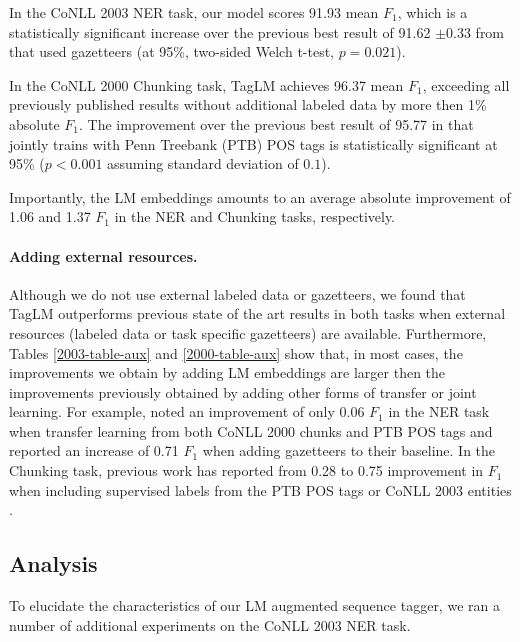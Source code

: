 \documentclass[11pt,a4paper]{article}
\begin{document}
In the CoNLL 2003 NER task, our model scores 91.93
mean $F_1$, which is a statistically significant increase over the previous best result of 91.62 $\pm 0.33$ from \citet{chiu-nichols-2016} that used gazetteers (at 95\%, two-sided Welch t-test, $p=0.021$).  

In the CoNLL 2000 Chunking task, TagLM achieves 96.37 mean $F_1$, exceeding all previously published
results without additional labeled data by more then 1\% absolute $F_1$. 
The improvement over the previous best result of 95.77 in \citet{joint-many-iclr07} that jointly trains with Penn Treebank (PTB) POS tags is statistically significant at
95\% ($p < 0.001$ assuming standard deviation of $0.1$).

Importantly, the LM embeddings amounts to an average absolute improvement of 1.06 and 1.37 $F_1$ in the NER and Chunking tasks, respectively.

\paragraph{Adding external resources.}
Although we do not use external labeled data or gazetteers, we found that TagLM outperforms previous state of the art results in both tasks when external resources (labeled data or task specific gazetteers) are available.
Furthermore, Tables \ref{2003-table-aux} and \ref{2000-table-aux} show that, in most cases,
the improvements we obtain by adding LM embeddings are larger then the improvements previously
obtained by adding other forms of transfer or joint learning.
For example, \citet{yang-transfer-iclr07} noted an improvement of only 0.06 $F_1$ in the NER task when
transfer learning from both CoNLL 2000 chunks and PTB POS tags and \citet{chiu-nichols-2016} reported
an increase of 0.71 $F_1$ when adding gazetteers to their baseline.
In the Chunking task, previous work has reported from 0.28 to 0.75 improvement in $F_1$ when including supervised labels from
the PTB POS tags or CoNLL 2003
entities \citep{yang-transfer-iclr07,Sgaard2016DeepML,joint-many-iclr07}.

\subsection{Analysis}
To elucidate the characteristics of our LM augmented sequence tagger, we ran a number of
additional experiments  on the CoNLL 2003 NER task.
\end{document}
